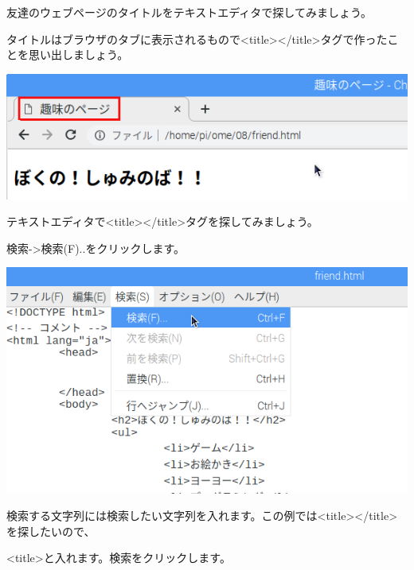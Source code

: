 \documentclass[a4paper,12pt,dvipdfmx]{jarticle}
\begin{document}
\bigskip


\bigskip

\clearpage
友達のウェブページのタイトルをテキストエディタで探してみましょう。

タイトルはブラウザのタブに表示されるもので{\textless}title{\textgreater}{\textless}/title{\textgreater}タグで作ったことを思い出しましょう。



\begin{center}
\includegraphics[width=16.782cm]{textbook-img009.png}

\end{center}

\bigskip

テキストエディタで{\textless}title{\textgreater}{\textless}/title{\textgreater}タグを探してみましょう。

検索-{\textgreater}検索(F)..をクリックします。

\begin{center}
\includegraphics[width=16.533cm]{textbook-img010.png}

\end{center}
\clearpage
検索する文字列には検索したい文字列を入れます。この例では{\textless}title{\textgreater}{\textless}/title{\textgreater}を探したいので、

{\textless}title{\textgreater}と入れます。検索をクリックします。
\end{document}
